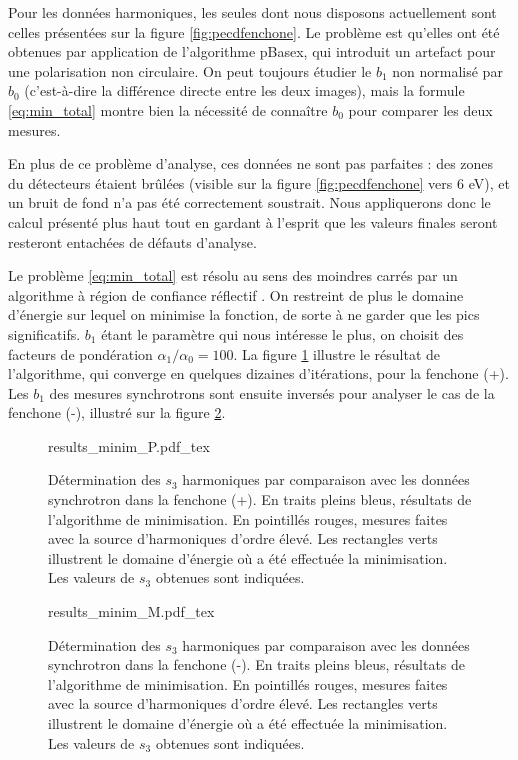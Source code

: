 Pour les données harmoniques, les seules dont nous disposons actuellement sont celles présentées sur la figure \ref{fig:pecdfenchone}. Le problème est qu'elles ont été obtenues par application de l'algorithme pBasex, qui introduit un artefact pour une polarisation non circulaire. On peut toujours étudier le $b_1$ non normalisé par $b_0$ (c'est-à-dire la différence directe entre les deux images), mais la formule \ref{eq:min_total} montre bien la nécessité de connaître $b_0$ pour comparer les deux mesures.

En plus de ce problème d'analyse, ces données ne sont pas parfaites : des zones du détecteurs étaient brûlées (visible sur la figure \ref{fig:pecdfenchone} vers 6 eV), et un bruit de fond n'a pas été correctement soustrait. Nous appliquerons donc le calcul présenté plus haut tout en gardant à l'esprit que les valeurs finales seront resteront entachées de défauts d'analyse. 

Le problème \ref{eq:min_total} est résolu au sens des moindres carrés par un algorithme à région de confiance réflectif . On restreint de plus le domaine d'énergie sur lequel on minimise la fonction, de sorte à ne garder que les pics significatifs. $b_1$ étant le paramètre qui nous intéresse le plus, on choisit des facteurs de pondération $\alpha_1/\alpha_0 = 100$. La figure \ref{fig:results_minim_P} illustre le résultat de l'algorithme, qui converge en quelques dizaines d'itérations, pour la fenchone (+). Les $b_1$ des mesures synchrotrons sont ensuite inversés pour analyser le cas de la fenchone (-), illustré sur la figure \ref{fig:results_minim_M}.

\begin{figure}[!ht]
\centering
\def\svgwidth{0.75\columnwidth}
{results_minim_P.pdf_tex}
\caption{Détermination des $s_3$ harmoniques par comparaison avec les données synchrotron dans la fenchone (+). En traits pleins bleus, résultats de l'algorithme de minimisation. En pointillés rouges, mesures faites avec la source d'harmoniques d'ordre élevé. Les rectangles verts illustrent le domaine d'énergie où a été effectuée la minimisation. Les valeurs de $s_3$ obtenues sont indiquées.}
\label{fig:results_minim_P}
\end{figure}

\begin{figure}[!ht]
\centering
\def\svgwidth{0.75\columnwidth}
{results_minim_M.pdf_tex}
\caption{Détermination des $s_3$ harmoniques par comparaison avec les données synchrotron dans la fenchone (-). En traits pleins bleus, résultats de l'algorithme de minimisation. En pointillés rouges, mesures faites avec la source d'harmoniques d'ordre élevé. Les rectangles verts illustrent le domaine d'énergie où a été effectuée la minimisation. Les valeurs de $s_3$ obtenues sont indiquées.}
\label{fig:results_minim_M}
\end{figure}

